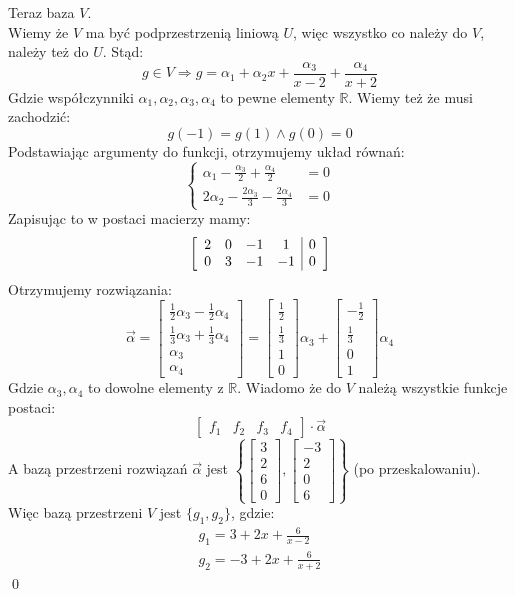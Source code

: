 \documentclass[11pt]{article}
\newcommand{\R}{\mathbb{R}}
\newcommand{\al}{\alpha}
\newcommand{\half}{\frac{1}{2}}
\begin{document}
Teraz baza $V$. \\[5pt]
Wiemy że $V$ ma być podprzestrzenią liniową $U$, więc wszystko co należy do $V$, należy też do $U$. Stąd:
$$g \in V \Longrightarrow g = \al_1 + \al_2 x + \frac{\al_3}{x-2} + \frac{\al_4}{x+2}$$
Gdzie współczynniki $\al_1, \al_2, \al_3, \al_4$ to pewne elementy $\R$.
Wiemy też że musi zachodzić:
$$g(-1) = g(1) \land g(0) = 0$$
Podstawiając argumenty do funkcji, otrzymujemy układ równań:
$$\begin{cases}
    \al_1 - \frac{\al_3}{2} + \frac{\al_4}{2} &= 0 \\
    2\al_2 - \frac{2\al_3}{3} - \frac{2\al_4}{3} &= 0
\end{cases}$$
Zapisując to w postaci macierzy mamy:
$$ 
\left[ \begin{array}{c c c c | c}
    2 & 0 & -1 & 1 & 0 \\
    0 & 3 & -1 & -1 & 0
\end{array} \right]
$$
Otrzymujemy rozwiązania:
$$\Vec{\al} = \begin{bmatrix}
    \half \al_3 - \half \al_4 \\
    \frac{1}{3} \al_3 + \frac{1}{3}\al_4 \\
    \al_3 \\
    \al_4
\end{bmatrix} = \begin{bmatrix}
    \half \\
    \frac{1}{3} \\
    1\\
    0
\end{bmatrix} \al_3 + \begin{bmatrix}
    -\half \\
    \frac{1}{3} \\
    0\\
    1
\end{bmatrix} \al_4
$$
Gdzie $\al_3, \al_4$ to dowolne elementy z $\R$. Wiadomo że do $V$ należą wszystkie funkcje postaci:
$$\begin{bmatrix}
    f_1 & f_2 & f_3 & f_4
\end{bmatrix} \cdot \Vec{\al}$$
A bazą przestrzeni rozwiązań $\Vec{\alpha}$ jest $\left\{\begin{bmatrix}
    3 \\
    2 \\
    6\\
    0
\end{bmatrix}, \begin{bmatrix}
    -3 \\
    2 \\
    0\\
    6
\end{bmatrix}\right\}$ (po przeskalowaniu). Więc bazą przestrzeni $V$ jest $\{g_1, g_2\}$, gdzie:
\begin{align*}
    g_1 = 3 + 2x + \frac{6}{x-2} \\
    g_2 = -3 + 2x + \frac{6}{x+2}
\end{align*}
\qed
\end{document}
